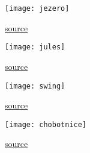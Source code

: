\documentclass[12pt,a4paper]{report}                      %
\begin{document}
\frontmatter

\contentsandlists

\mainmatter



\begin{figure}[H]
  \centering
  \caption{\href{https://davidramos.ca/wp-content/uploads/2021/04/cyn-1024x576.png}{source}}
  \texttt{[image: jezero]}
\end{figure}




\begin{figure}[H]
  \centering
  \caption{\href{https://aukceaukci.s3.amazonaws.com/aukceaukci/production/files/2024/02/06/10/15/12/906b839a-538e-4f31-bbcc-131d423cb646/1.webp}{source}}
  \texttt{[image: jules]}
\end{figure}




\begin{figure}[H]
  \centering
  \caption{\href{https://pbs.twimg.com/media/EGcmJ2vU0AIqTU9?format=jpg&name=large}{source}}
  \texttt{[image: swing]}
\end{figure}




\begin{figure}[H]
  \centering
  \caption{\href{https://www.humanart.cz/user/2527/art/st/2527-1324900216-2.jpg}{source}}
  \texttt{[image: chobotnice]}
\end{figure}

\end{document}
